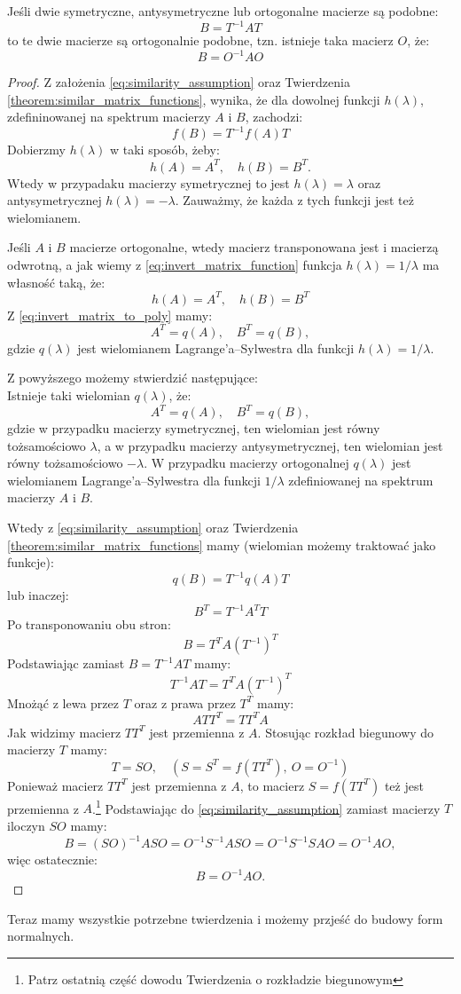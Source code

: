 \begin{theorem}
    Jeśli dwie symetryczne, antysymetryczne lub ortogonalne macierze są podobne:
    \begin{equation}\label{eq:similarity_assumption}
        B = T^{-1}AT
    \end{equation}
    to te dwie macierze są ortogonalnie podobne, tzn. istnieje taka macierz $O$, że:
    $$B = O^{-1}AO$$  
\end{theorem}
\begin{proof}
    Z założenia \eqref{eq:similarity_assumption} oraz Twierdzenia \ref{theorem:similar_matrix_functions}, wynika, że dla dowolnej funkcji $h(\lambda)$, zdefininowanej na spektrum macierzy $A$ i $B$, zachodzi:
    $$f(B) = T^{-1}f(A)T$$
    Dobierzmy $h(\lambda)$ w taki sposób, żeby:
    $$h(A) = A^T, \quad h(B) = B^T.$$
    Wtedy w przypadaku macierzy symetrycznej to jest $h(\lambda) = \lambda$ oraz antysymetrycznej $h(\lambda) = -\lambda$. Zauważmy, że każda z tych funkcji jest też wielomianem.

    Jeśli $A$ i $B$ macierze ortogonalne, wtedy macierz transponowana jest i macierzą odwrotną, a jak wiemy z \eqref{eq:invert_matrix_function} funkcja $h(\lambda) = 1/\lambda$ ma własność taką, że:
    $$h(A) = A^{T}, \quad h(B) = B^{T}$$
    Z \eqref{eq:invert_matrix_to_poly} mamy:
    $$ A^{T} = q(A), \quad B^{T} = q(B),$$
    gdzie $q(\lambda)$ jest wielomianem Lagrange'a--Sylwestra dla funkcji $h(\lambda) = 1/\lambda$.

    Z powyższego możemy stwierdzić następujące: \\
    Istnieje taki wielomian $q(\lambda)$, że:
    $$ A^{T} = q(A), \quad B^{T} = q(B),$$
    gdzie w przypadku macierzy symetrycznej, ten wielomian jest równy tożsamościowo $\lambda$, a w przypadku macierzy antysymetrycznej, ten wielomian jest równy tożsamościowo $-\lambda$. W przypadku macierzy ortogonalnej $q(\lambda)$ jest wielomianem Lagrange'a--Sylwestra dla funkcji $1/\lambda$ zdefiniowanej na spektrum macierzy $A$ i $B$.

    Wtedy z \eqref{eq:similarity_assumption} oraz Twierdzenia \ref{theorem:similar_matrix_functions} mamy (wielomian możemy traktować jako funkcje):
    $$ q(B) = T^{-1}q(A)T $$
    lub inaczej:
    $$ B^T = T^{-1}A^TT $$
    Po transponowaniu obu stron:
    $$ B = T^TA(T^{-1})^T $$
    Podstawiając zamiast $B = T^{-1}AT$ mamy:
    $$ T^{-1}AT = T^TA(T^{-1})^T $$
    Mnożąć z lewa przez $T$ oraz z prawa przez $T^T$ mamy:
    $$ ATT^T = TT^TA $$
    Jak widzimy macierz $TT^T$ jest przemienna z $A$. Stosując rozkład biegunowy do macierzy $T$ mamy:
    $$ T = SO, \quad (S = S^T = f(TT^T), \ O = O^{-1}) $$
    Ponieważ macierz $TT^T$ jest przemienna z $A$, to macierz $S =f(TT^T)$ też jest przemienna z $A$.\footnote{Patrz ostatnią część dowodu Twierdzenia o rozkładzie biegunowym} Podstawiając do \eqref{eq:similarity_assumption} zamiast macierzy $T$ iloczyn $SO$ mamy:
    $$ B = (SO)^{-1}ASO = O^{-1}S^{-1}ASO = O^{-1}S^{-1}SAO = O^{-1}AO,$$
    więc ostatecznie:
    $$B = O^{-1}AO.$$    
\end{proof}
Teraz mamy wszystkie potrzebne twierdzenia i możemy przjeść do budowy form normalnych.


